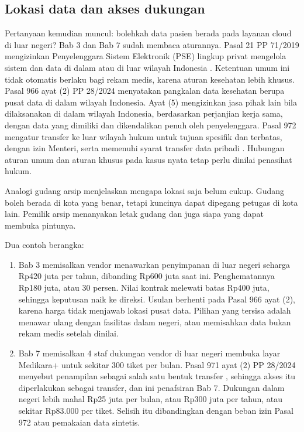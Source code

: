 \subsection*{Lokasi data dan akses dukungan}

Pertanyaan kemudian muncul: bolehkah data pasien berada pada layanan cloud di luar negeri? Bab 3 dan
Bab 7 sudah membaca aturannya. Pasal 21 PP 71/2019 mengizinkan Penyelenggara Sistem Elektronik (PSE)
lingkup privat mengelola sistem dan data di dalam atau di luar wilayah Indonesia
\cite{pp71-2019-pste}. Ketentuan umum ini tidak otomatis berlaku bagi rekam medis, karena aturan
kesehatan lebih khusus. Pasal 966 ayat (2) PP 28/2024 menyatakan pangkalan data kesehatan berupa
pusat data di dalam wilayah Indonesia. Ayat (5) mengizinkan jasa pihak lain bila dilaksanakan di
dalam wilayah Indonesia, berdasarkan perjanjian kerja sama, dengan data yang dimiliki dan
dikendalikan penuh oleh penyelenggara. Pasal 972 mengatur transfer ke luar wilayah hukum untuk
tujuan spesifik dan terbatas, dengan izin Menteri, serta memenuhi syarat transfer data pribadi
\cite{pp28-2024-kesehatan}. Hubungan aturan umum dan aturan khusus pada kasus nyata tetap perlu
dinilai penasihat hukum.

Analogi gudang arsip menjelaskan mengapa lokasi saja belum cukup. Gudang boleh berada di kota yang
benar, tetapi kuncinya dapat dipegang petugas di kota lain. Pemilik arsip menanyakan letak gudang
dan juga siapa yang dapat membuka pintunya.

Dua contoh berangka:
\begin{enumerate}
  \item Bab 3 memisalkan vendor menawarkan penyimpanan di luar negeri seharga Rp420 juta per tahun,
  dibanding Rp600 juta saat ini. Penghematannya Rp180 juta, atau 30 persen. Nilai kontrak melewati
  batas Rp400 juta, sehingga keputusan naik ke direksi. Usulan berhenti pada Pasal 966 ayat (2),
  karena harga tidak menjawab lokasi pusat data. Pilihan yang tersisa adalah menawar ulang dengan
  fasilitas dalam negeri, atau memisahkan data bukan rekam medis setelah dinilai.
  \item Bab 7 memisalkan 4 staf dukungan vendor di luar negeri membuka layar Medikara+ untuk sekitar
  300 tiket per bulan. Pasal 971 ayat (2) PP 28/2024 menyebut penampilan sebagai salah satu bentuk
  transfer \cite{pp28-2024-kesehatan}, sehingga akses itu diperlakukan sebagai transfer, dan ini
  penafsiran Bab 7. Dukungan dalam negeri lebih mahal Rp25 juta per bulan, atau Rp300 juta per
  tahun, atau sekitar Rp83.000 per tiket. Selisih itu dibandingkan dengan beban izin Pasal 972 atau
  pemakaian data sintetis.
\end{enumerate}

